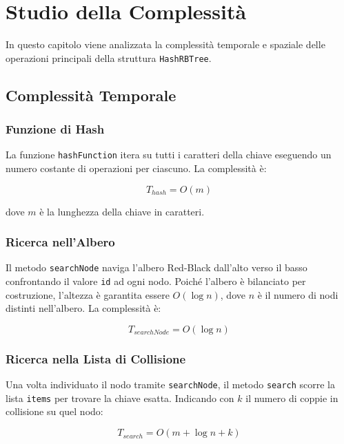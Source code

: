 \chapter{Studio della Complessità}

In questo capitolo viene analizzata la complessità temporale e spaziale 
delle operazioni principali della struttura \texttt{HashRBTree}.

\section{Complessità Temporale}

\subsection{Funzione di Hash}

La funzione \texttt{hashFunction} itera su tutti i caratteri della chiave 
eseguendo un numero costante di operazioni per ciascuno. La complessità è:

\begin{equation}
    T_{hash} = O(m)
\end{equation}

dove $m$ è la lunghezza della chiave in caratteri.

\subsection{Ricerca nell'Albero}

Il metodo \texttt{searchNode} naviga l'albero Red-Black dall'alto verso il 
basso confrontando il valore \texttt{id} ad ogni nodo. Poiché l'albero è 
bilanciato per costruzione, l'altezza è garantita essere $O(\log n)$, dove 
$n$ è il numero di nodi distinti nell'albero. La complessità è:

\begin{equation}
    T_{searchNode} = O(\log n)
\end{equation}

\subsection{Ricerca nella Lista di Collisione}

Una volta individuato il nodo tramite \texttt{searchNode}, il metodo 
\texttt{search} scorre la lista \texttt{items} per trovare la chiave esatta. 
Indicando con $k$ il numero di coppie in collisione su quel nodo:

\begin{equation}
    T_{search} = O(m + \log n + k)
\end{equation}

